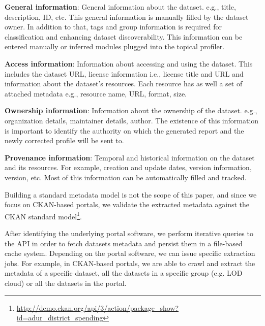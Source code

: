 \documentclass[runningheads,a4paper]{llncs}
\begin{document}
\textbf{General information}: General information about the dataset. e.g., title, description, ID, etc. This general information is manually filled by the dataset owner. In addition to that, tags and group information is required for classification and enhancing dataset discoverability. This information can be entered manually or inferred modules plugged into the topical profiler.

\textbf{Access information}: Information about accessing and using the dataset. This includes the dataset URL, license information i.e., license title and URL and information about the dataset's resources. Each resource has as well a set of attached metadata e.g., resource name, URL, format, size.

\textbf{Ownership information}: Information about the ownership of the dataset. e.g., organization details, maintainer details, author. The existence of this information is important to identify the authority on which the generated report and the newly corrected profile will be sent to.

\textbf{Provenance information}: Temporal and historical information on the dataset and its resources. For example, creation and update dates, version information, version, etc. Most of this information can be automatically filled and tracked.

Building a standard metadata model is not the scope of this paper, and since we focus on CKAN-based portals, we validate the extracted metadata against the CKAN standard model\footnote{\url{http://demo.ckan.org/api/3/action/package\_show?id=adur\_district\_spending}}.

After identifying the underlying portal software, we perform iterative queries to the API in order to fetch datasets metadata and persist them in a file-based cache system. Depending on the portal software, we can issue specific extraction jobs. For example, in CKAN-based portals, we are able to crawl and extract the metadata of a specific dataset, all the datasets in a specific group (e.g. LOD cloud) or all the datasets in the portal.
\end{document}
